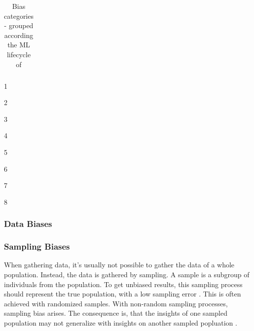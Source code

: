 \documentclass[12pt, a4paper, oneside]{book}   	%
\renewcommand{\paragraph}[1]{%
	\subsubsection*{#1}%
}
\newcommand{\tblWidthDescription}{\hsize=0.6\hsize\raggedright}
\newcommand{\tblWidthContext}{\hsize=0.2\hsize}
\begin{document}
\begin{table}[H]
\begin{threeparttable}
\begin{tabularx}{\textwidth}{>{\tblWidthDescription}X|>{\tblWidthContext}X|>{\tblWidthContext}X}
						\bottomrule
					\end{tabularx}
					\begin{tablenotes}
						\footnotesize
						\begin{minipage}{0.33\textwidth}\raggedright
							\item[1] \autocite{Mehrabi_2021}
							\item[2] \autocite{HP_2022}
							\item[3] \autocites{Mester_2022}
						\end{minipage}%
						\begin{minipage}{0.33\textwidth}\raggedright
							\item[4] \autocite{Chakraborty_2024}
							\item[5] \autocite{Young_2020}
							\item[6] \autocite{Montoya_2025}
						\end{minipage}%
						\begin{minipage}{0.33\textwidth}\raggedright
							\item[7] \autocites{Mester_2017}
							\item[8] \autocite{Delgado-Rodriguez_2004}
						\end{minipage}%
					\end{tablenotes}
				\end{threeparttable}
				\caption{Bias categories - grouped according the ML lifecycle of \cite{Mehrabi_2021}}
				\label{tab:biases_types}
			\end{table}
			
			\subsubsection{Data Biases}
				
				\paragraph{Sampling Biases}
				When gathering data, it's usually not possible to gather the data of a whole population. Instead, the data is gathered by sampling. A sample is a subgroup of individuals from the population. To get unbiased results, this sampling process should represent the true population, with a low sampling error \autocites{HP_2022}. This is often achieved with randomized samples. With non-random sampling processes, sampling bias arises. The consequence is, that the insights of one sampled population may not generalize with insights on another sampled popluation \autocite{Mehrabi_2021}.
				
\end{document}
